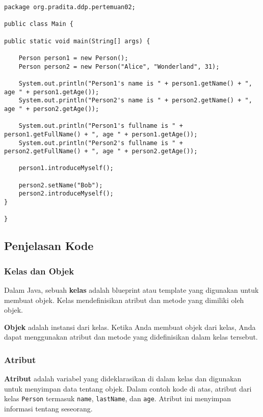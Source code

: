 \begin{lstlisting}[style=JavaStyle, caption={Kode Java: Main.java}]
package org.pradita.ddp.pertemuan02;

public class Main {

public static void main(String[] args) {
	
	Person person1 = new Person();
	Person person2 = new Person("Alice", "Wonderland", 31);
	
	System.out.println("Person1's name is " + person1.getName() + ", age " + person1.getAge());
	System.out.println("Person2's name is " + person2.getName() + ", age " + person2.getAge());
	
	System.out.println("Person1's fullname is " + person1.getFullName() + ", age " + person1.getAge());
	System.out.println("Person2's fullname is " + person2.getFullName() + ", age " + person2.getAge());
	
	person1.introduceMyself();
	
	person2.setName("Bob");
	person2.introduceMyself();
}

}
\end{lstlisting}

\subsection{Penjelasan Kode}

\subsubsection{Kelas dan Objek}

Dalam Java, sebuah \textbf{kelas} adalah blueprint atau template yang digunakan untuk membuat objek. Kelas mendefinisikan atribut dan metode yang dimiliki oleh objek. 

\textbf{Objek} adalah instansi dari kelas. Ketika Anda membuat objek dari kelas, Anda dapat menggunakan atribut dan metode yang didefinisikan dalam kelas tersebut.

\subsubsection{Atribut}

\textbf{Atribut} adalah variabel yang dideklarasikan di dalam kelas dan digunakan untuk menyimpan data tentang objek. Dalam contoh kode di atas, atribut dari kelas \texttt{Person} termasuk \texttt{name}, \texttt{lastName}, dan \texttt{age}. Atribut ini menyimpan informasi tentang seseorang.

